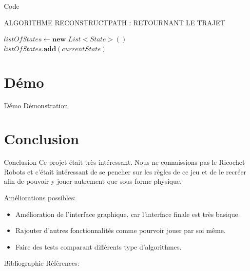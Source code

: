\documentclass{beamer}
\begin{document}
\begin{frame}{Code}
{        \begin{algorithm}[H]
            \caption{ALGORITHME RECONSTRUCTPATH : RETOURNANT LE TRAJET}
            $listOfStates \gets \textbf{new}$ $List<State>()$\\
            $listOfStates.\textbf{add}(currentState)$\\
        
        \end{algorithm}
        }
    \end{frame}  

    \section{Démo}
        \begin{frame}{Démo}
            \centering
                Démonstration
        \end{frame}
    
    \section{Conclusion}
        \begin{frame}{Conclusion}
            Ce projet était très intéressant. Nous ne connaissions pas le Ricochet Robots et c'était intéressant de se pencher sur les règles de ce jeu et de le recréer afin de pouvoir y jouer autrement que sous forme physique.
    
            \vspace{0.5cm}
            Améliorations possibles:
            \begin{itemize}
                \item Amélioration de  l'interface graphique, car l'interface finale est très basique.
		        \item Rajouter d'autres fonctionnalités comme pourvoir jouer par soi même.
		        \item Faire des tests comparant différents type d'algorithmes.
            \end{itemize}
        \end{frame}

    \begin{frame}{Bibliographie}
        Références:
        
               
    \end{frame}    
\end{document}
